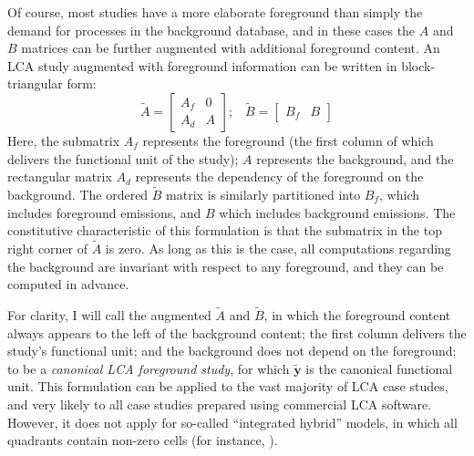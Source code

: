 
Of course, most studies have a more elaborate foreground than simply the demand for processes in the background database, and in these cases the $A$ and $B$ matrices can be further augmented with additional foreground content.  An LCA study augmented with foreground information can be written in block-triangular form:
\begin{equation}
\tilde{A} = \left[\begin{array}{cc}
A_f & 0 \\
A_d &  A
  \end{array}
\right];\;\;\;
  \tilde{B} = \left[\begin{array}{cc} B_f & B   \end{array}\right]
\label{eqn:foreground}
\end{equation}
Here, the submatrix $A_f$ represents the foreground (the first column of which delivers the functional unit of the study); $A$ represents the background, and the rectangular matrix $A_d$ represents the dependency of the foreground on the background.  The ordered $\tilde{B}$ matrix is similarly partitioned into $B_f$, which includes foreground emissions, and $B$ which includes background emissions. The constitutive characteristic of this formulation is that the submatrix in the top right corner of $\tilde{A}$ is zero.  As long as this is the case, all computations regarding the background are invariant with respect to any foreground, and they can be computed in advance.

For clarity, I will call the augmented $\tilde{A}$ and $\tilde{B}$, in which the foreground content always appears to the left of the background content; the first column delivers the study's functional unit; and the background does not depend on the foreground; to be a \emph{canonical LCA foreground study}, for which $\tilde{\mathbf{y}}$ is the canonical functional unit.  This formulation can be applied to the vast majority of LCA case studes, and very likely to all case studies prepared using commercial LCA software.  However, it does not apply for so-called ``integrated hybrid'' models, in which all quadrants contain non-zero cells (for instance, \cite{Gibon_2016}).

